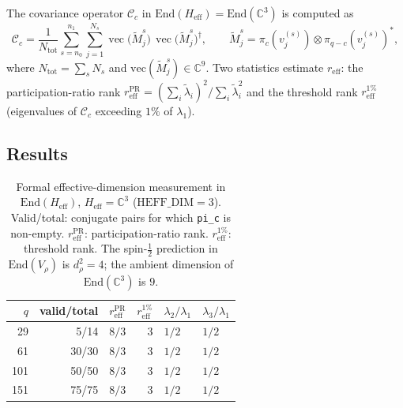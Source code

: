 \documentclass[11pt,a4paper]{article}
\theoremstyle{definition}
\begin{document}
    The covariance operator $\mathcal{C}_c$ in $\mathrm{End}(H_{\mathrm{eff}})
  = \mathrm{End}(\mathbb{C}^3)$ is computed as
    \begin{equation}
      \mathcal{C}_c = \frac{1}{N_{\mathrm{tot}}}
      \sum_{s=n_0}^{n_1} \sum_{j=1}^{N_s}
      \operatorname{vec}\!\bigl(\widetilde{M}^s_j\bigr)\,
      \operatorname{vec}\!\bigl(\widetilde{M}^s_j\bigr)^\dagger, \qquad
      \widetilde{M}^s_j = \pi_c\!\left(v^{(s)}_j\right) \otimes
      \pi_{q-c}\!\left(v^{(s)}_j\right)^*,
      \label{eq:covariance_b}
    \end{equation}
    where $N_{\mathrm{tot}} = \sum_s N_s$ and
    $\mathrm{vec}(\widetilde{M}^s_j) \in \mathbb{C}^9$.
    Two statistics estimate $r_{\mathrm{eff}}$: the participation-ratio rank
    $r_{\mathrm{eff}}^{\mathrm{PR}} = (\sum_i \tilde\lambda_i)^2 / \sum_i \tilde\lambda_i^2$
    and the threshold rank $r_{\mathrm{eff}}^{1\%}$ (eigenvalues of $\mathcal{C}_c$
    exceeding $1\%$ of $\lambda_1$).

  \subsection{Results}

    \begin{table}[ht]
      \centering
      \caption{Formal effective-dimension measurement in $\mathrm{End}(H_{\mathrm{eff}})$,
        $H_{\mathrm{eff}} = \mathbb{C}^3$ ($\mathrm{HEFF\_DIM} = 3$).
        Valid/total: conjugate pairs for which \texttt{pi\_c} is non-empty.
        $r_{\mathrm{eff}}^{\mathrm{PR}}$: participation-ratio rank.
        $r_{\mathrm{eff}}^{1\%}$: threshold rank.
        The spin-$\tfrac{1}{2}$ prediction in $\mathrm{End}(V_\rho)$ is $d_\rho^2 = 4$;
        the ambient dimension of $\mathrm{End}(\mathbb{C}^3)$ is $9$.}
      \label{tab:reff}
      \begin{tabular}{rrrrll}
        \toprule
        $q$ & valid/total & $r_{\mathrm{eff}}^{\mathrm{PR}}$ &
        $r_{\mathrm{eff}}^{1\%}$ & $\lambda_2/\lambda_1$ & $\lambda_3/\lambda_1$ \\
        \midrule
        29  & 5/14  & $8/3$ & 3 & $1/2$ & $1/2$ \\
        61  & 30/30 & $8/3$ & 3 & $1/2$ & $1/2$ \\
        101 & 50/50 & $8/3$ & 3 & $1/2$ & $1/2$ \\
        151 & 75/75 & $8/3$ & 3 & $1/2$ & $1/2$ \\
        \bottomrule
      \end{tabular}
    \end{table}
\end{document}
